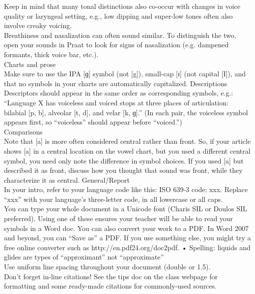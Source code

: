 \documentclass[12pt]{article}
\begin{document}
Keep in mind that many tonal distinctions also co-occur with changes in voice quality or laryngeal setting, e.g., low dipping and super-low tones often also involve creaky voicing.\\
Breathiness and nasalization can often sound similar.  To distinguish the two, open your sounds in Praat to look for signs of nasalization (e.g. dampened formants, thick voice bar, etc.).\\
Charts and prose\\
Make sure to use the IPA [ɡ] symbol (not [g]), small-cap [ɪ] (not capital [I]), and that no symbols in your charts are automatically capitalized. Descriptions\\
Descriptors should appear in the same order as corresponding symbols, e.g.: “Language X has voiceless and voiced stops at three places of articulation: bilabial [p, b], alveolar [t, d], and velar [k, ɡ].” (In each pair, the voiceless symbol appears first, so “voiceless” should appear before “voiced.”)\\
Comparisons\\
Note that [a] is more often considered central rather than front.  So, if your article shows [a] in a central location on the vowel chart, but you used a different central symbol, you need only note the difference in symbol choices.  If you used [a] but described it as front, discuss how you thought that sound was front, while they characterize it as central.  General/Report\\
In your intro, refer to your language code like this: ISO 639-3 code: xxx. Replace “xxx” with your language’s three-letter code, in all lowercase or all caps.\\
You can type your whole document in a Unicode font (Charis SIL or Doulos SIL preferred).  Using one of these ensures your teacher will be able to read your symbols in a Word doc.  You can also convert your work to a PDF.  In Word 2007 and beyond, you can “Save as” a PDF.  If you use something else, you might try a free online converter such as http://en.pdf24.org/doc2pdf. • 	Spelling: liquids and glides are types of “approximant” not “approximate”\\
Use uniform line spacing throughout your document (double or 1.5).\\
Don’t forget in-line citations!  See the tips doc on the class webpage for formatting and some ready-made citations for commonly-used sources.\\
\end{document}
